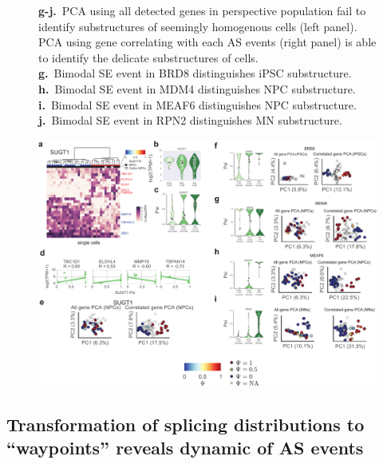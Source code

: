 \begin{figure}[h]
{\textbf{g-j.}~PCA using all detected genes in perspective population fail to identify substructures of seemingly homogenous cells (left panel). PCA using gene correlating with each AS events (right panel) is able to identify the delicate substructures of cells.\\
\textbf{g.}~Bimodal SE event in BRD8 distinguishes iPSC substructure.\\
\textbf{h.}~Bimodal SE event in MDM4 distinguishes NPC substructure.\\
\textbf{i.}~Bimodal SE event in MEAF6 distinguishes NPC substructure.\\
\textbf{j.}~Bimodal SE event in RPN2 distinguishes MN substructure.\\
}
\label{fig:hidden_cell_states_supplementary_part2}

\end{figure}
\clearpage
\begin{figure}[h]
\ContinuedFloat
\captionsetup{labelformat=empty}
\centering
\includegraphics[width=5.8in]{figures/hidden_cell_states_supplementary_part2.pdf}
\end{figure}
\addtocounter{figure}{1}
\clearpage


\subsection{Transformation of splicing distributions to ``waypoints'' reveals dynamic of AS events}

